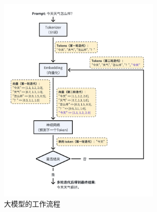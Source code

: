 \documentclass[letterpaper,11pt]{article}
\numberwithin{equation}{section}
\begin{document}
\begin{figure}[htbp]
    \centering
    \includegraphics[width=0.7\textwidth]{../../assets/imgs/ai_share/llm_workflow.png}
    \caption{大模型的工作流程}
    \label{llm-workflow}
\end{figure}

\printbibliography[title={引用}]
\end{document}
